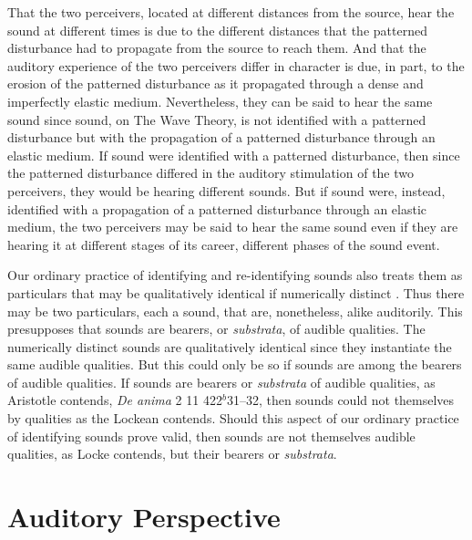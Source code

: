 That the two perceivers, located at different distances from the source, hear the sound at different times is due to the different distances that the patterned disturbance had to propagate from the source to reach them. And that the auditory experience of the two perceivers differ in character is due, in part, to the erosion of the patterned disturbance as it propagated through a dense and imperfectly elastic medium. Nevertheless, they can be said to hear the same sound since sound, on The Wave Theory, is not identified with a patterned disturbance but with the propagation of a patterned disturbance through an elastic medium. If sound were identified with a patterned disturbance, then since the patterned disturbance differed in the auditory stimulation of the two perceivers, they would be hearing different sounds. But if sound were, instead, identified with a propagation of a patterned disturbance through an elastic medium, the two perceivers may be said to hear the same sound even if they are hearing it at different stages of its career, different phases of the sound event.

Our ordinary practice of identifying and re-identifying sounds also treats them as particulars that may be qualitatively identical if numerically distinct \citep[70]{Nudds:2009sf}. Thus there may be two particulars, each a sound, that are, nonetheless, alike auditorily. This presupposes that sounds are bearers, or \emph{substrata}, of audible qualities. The numerically distinct sounds are qualitatively identical since they instantiate the same audible qualities. But this could only be so if sounds are among the bearers of audible qualities. If sounds are bearers or \emph{substrata} of audible qualities, as Aristotle contends, \emph{De anima} 2 11 422\( ^{b} \)31--32, then sounds could not themselves by qualities as the Lockean contends. Should this aspect of our ordinary practice of identifying sounds prove valid, then sounds are not themselves audible qualities, as Locke contends, but their bearers or \emph{substrata}. 


\section{Auditory Perspective} %
\label{sec:auditory_perspective}

